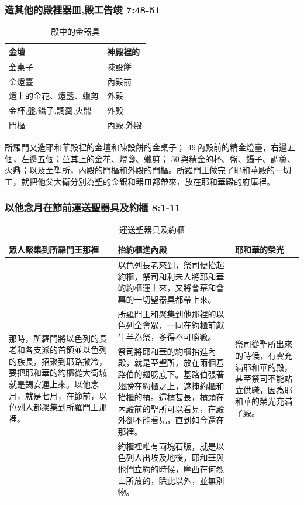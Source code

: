 \subsubsection{造其他的殿裡器皿,殿工告竣 7:48-51}
\begin{table}
\vspace{-5mm}
\centering 
\begin{tabular}{p{4.5cm}|p{2cm}}
\hline
\hline
金壇    & 神殿裡的\\\hline
金桌子  &  陳設餅\\\hline
金燈臺& 內殿前\\\hline
燈上的金花、燈盞、蠟剪&外殿\\\hline
金杯,盤,鑷子,調羹,火鼎&外殿\\\hline
門樞&內殿,外殿\\\hline
\end{tabular}
\caption{殿中的金器具}
\end{table}
所羅門又造耶和華殿裡的金壇和陳設餅的金桌子； 49 內殿前的精金燈臺，右邊五個，左邊五個；並其上的金花、燈盞、蠟剪； 50 與精金的杯、盤、鑷子、調羹、火鼎；以及至聖所，內殿的門樞和外殿的門樞。所羅門王做完了耶和華殿的一切工，就把他父大衛分別為聖的金銀和器皿都帶來，放在耶和華殿的府庫裡。


\subsubsection{以他念月在節前運送聖器具及約櫃 8:1-11}
\begin{table}[H]
\centering 
\begin{tabular}{p{}|p{11.25cm}|p{2.2cm}}\hline\hline
眾人聚集到所羅門王那裡&抬約櫃進內殿&耶和華的榮光\\\hline
\multirow{4}{4.1cm}{那時，所羅門將以色列的長老和各支派的首領並以色列的族長，招聚到耶路撒冷，要把耶和華的約櫃從大衛城就是錫安運上來。以他念月，就是七月，在節前，以色列人都聚集到所羅門王那裡。}
&以色列長老來到，祭司便抬起約櫃，祭司和利未人將耶和華的約櫃運上來，又將會幕和會幕的一切聖器具都帶上來。
&\multirow{4}{2.3cm}{祭司從聖所出來的時候，有雲充滿耶和華的殿，甚至祭司不能站立供職，因為耶和華的榮光充滿了殿。}\\\cline{2-2}
&所羅門王和聚集到他那裡的以色列全會眾，一同在約櫃前獻牛羊為祭，多得不可勝數。&\\\cline{2-2}
&祭司將耶和華的約櫃抬進內殿，就是至聖所，放在兩個基路伯的翅膀底下。基路伯張著翅膀在約櫃之上，遮掩約櫃和抬櫃的槓。這槓甚長，槓頭在內殿前的聖所可以看見，在殿外卻不能看見，直到如今還在那裡。&\\\cline{2-2}
&約櫃裡唯有兩塊石版，就是以色列人出埃及地後，耶和華與他們立約的時候，摩西在何烈山所放的，除此以外，並無別物。&\\\hline
\end{tabular}
\caption{運送聖器具及約櫃}
\end{table}

